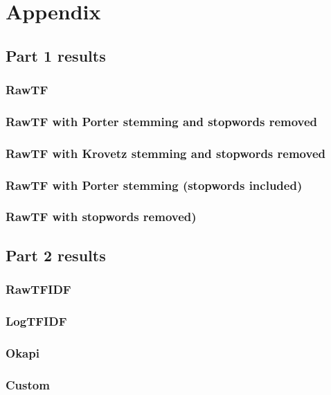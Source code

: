 \documentclass{article}
\begin{document}
\section{Appendix}

\subsection{Part 1 results}
\subsubsection{RawTF} 
\label{sec:rawtf}


\subsubsection{RawTF with Porter stemming and stopwords removed} \label{sec:rawtf_porter_nostopw}


\subsubsection{RawTF with Krovetz stemming and stopwords removed} \label{sec:rawtf_krovetz_nostopw}


\subsubsection{RawTF with Porter stemming (stopwords included)}
\label{sec:rawtf_porter}


\subsubsection{RawTF with stopwords removed)}
\label{sec:rawtf_nostopw}


\pagebreak

\subsection{Part 2 results}
\subsubsection{RawTFIDF} 
\label{sec:rawtfidf}


\subsubsection{LogTFIDF} 
\label{sec:logtfidf}


\subsubsection{Okapi} 
\label{sec:okapi}


\subsubsection{Custom} 
\label{sec:custom}

\end{document}

